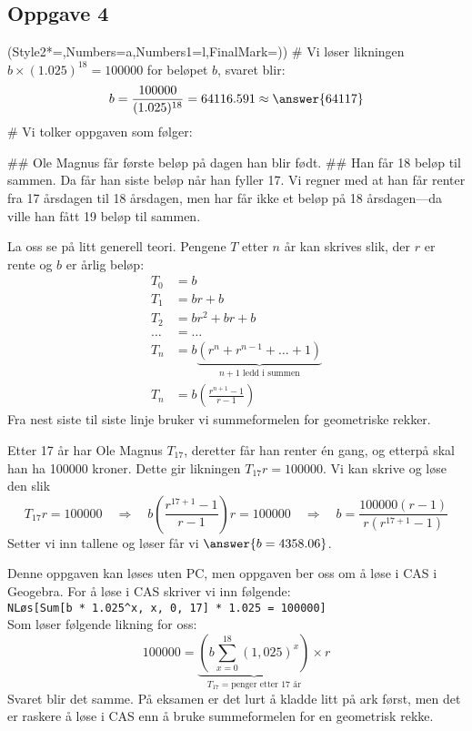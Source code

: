 \subsection*{Oppgave 4}
\begin{easylist}[enumerate]
	\ListProperties(Style2*=,Numbers=a,Numbers1=l,FinalMark={)})
	# Vi løser likningen $b\times (1.025)^{18} = 100000$ for beløpet $b$, svaret blir:
	\begin{equation*}
		b = \frac{100000}{(1.025)^{18}} = 64116.591 \approx \answer{64117}
	\end{equation*}
	# Vi tolker oppgaven som følger:
	\begin{easylist}
		## Ole Magnus får første beløp på dagen han blir født. 
		## Han får 18 beløp til sammen. 
		Da får han siste beløp når han fyller 17. 
		Vi regner med at han får renter fra 17 årsdagen til 18 årsdagen,
		men har får ikke et beløp på 18 årsdagen---da ville han fått 19 beløp til sammen.
	\end{easylist} 
	La oss se på litt generell teori.
	Pengene $T$ etter $n$ år kan skrives slik, der $r$ er rente og $b$ er årlig beløp:
	\begin{align*}
		T_0 &= b \\
		T_1 &= br + b \\
		T_2 &= br^2 + br + b \\
		\ldots &= \ldots \\
		T_n &= b  \underbrace{ \left( r^n + r^{n-1} + \dots + 1 \right)}_{n+1\text{ ledd i summen}}   \\
		T_n &= b  \left( \frac{r^{n+1}-1}{r-1} \right)   
	\end{align*}
	Fra nest siste til siste linje bruker vi summeformelen for geometriske rekker.
	
	Etter 17 år har Ole Magnus $T_{17}$, deretter får han renter én gang, og etterpå skal han ha 100000 kroner. 
	Dette gir likningen $T_{17}r = 100000$. Vi kan skrive og løse den slik
	\begin{equation*}
		T_{17}r = 100000 
		\quad \Rightarrow \quad
		b  \left( \frac{r^{17+1}-1}{r-1} \right) r = 100000
		\quad \Rightarrow \quad
		b = \frac{100000(r-1)}{r(r^{17+1}-1)}
	\end{equation*}
	Setter vi inn tallene og løser får vi $\answer{b = 4358.06}$.
	
	Denne oppgaven kan løses uten PC, men oppgaven ber oss om å løse i CAS i Geogebra. For å løse i CAS skriver vi inn følgende: \\
	\texttt{NLøs[Sum[b * 1.025\textasciicircum x, x, 0, 17] * 1.025 = 100000]} \\
	Som løser følgende likning for oss:
	\begin{equation*}
		100000 = \underbrace{\left( b \sum_{x=0}^{18} (1,025)^x \right)}_{T_{17} = \text{penger etter 17 år}} \times r
	\end{equation*}
	Svaret blir det samme. På eksamen er det lurt å kladde litt på ark først, men det er raskere å løse i CAS enn å bruke summeformelen for en geometrisk rekke.
	

\end{easylist}
